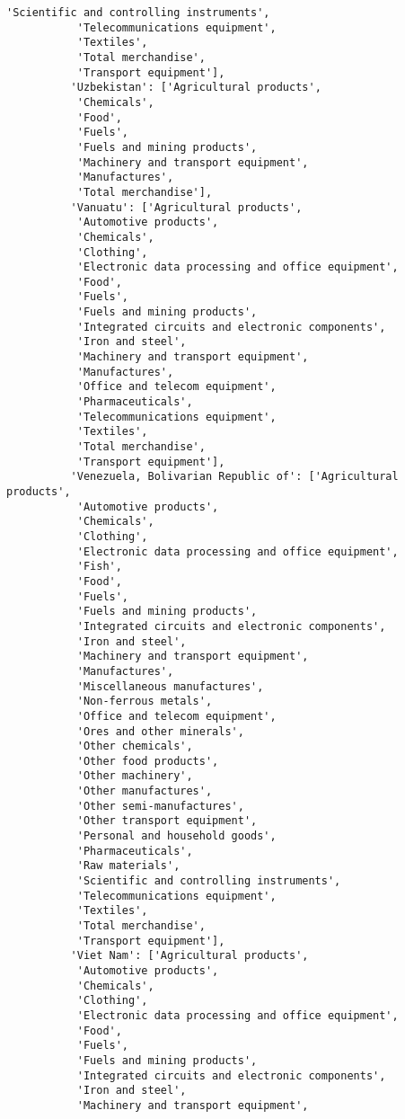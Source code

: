 \documentclass[11pt]{article}
\begin{document}
\begin{Verbatim}[commandchars=\\\{\}]
           'Scientific and controlling instruments',
           'Telecommunications equipment',
           'Textiles',
           'Total merchandise',
           'Transport equipment'],
          'Uzbekistan': ['Agricultural products',
           'Chemicals',
           'Food',
           'Fuels',
           'Fuels and mining products',
           'Machinery and transport equipment',
           'Manufactures',
           'Total merchandise'],
          'Vanuatu': ['Agricultural products',
           'Automotive products',
           'Chemicals',
           'Clothing',
           'Electronic data processing and office equipment',
           'Food',
           'Fuels',
           'Fuels and mining products',
           'Integrated circuits and electronic components',
           'Iron and steel',
           'Machinery and transport equipment',
           'Manufactures',
           'Office and telecom equipment',
           'Pharmaceuticals',
           'Telecommunications equipment',
           'Textiles',
           'Total merchandise',
           'Transport equipment'],
          'Venezuela, Bolivarian Republic of': ['Agricultural products',
           'Automotive products',
           'Chemicals',
           'Clothing',
           'Electronic data processing and office equipment',
           'Fish',
           'Food',
           'Fuels',
           'Fuels and mining products',
           'Integrated circuits and electronic components',
           'Iron and steel',
           'Machinery and transport equipment',
           'Manufactures',
           'Miscellaneous manufactures',
           'Non-ferrous metals',
           'Office and telecom equipment',
           'Ores and other minerals',
           'Other chemicals',
           'Other food products',
           'Other machinery',
           'Other manufactures',
           'Other semi-manufactures',
           'Other transport equipment',
           'Personal and household goods',
           'Pharmaceuticals',
           'Raw materials',
           'Scientific and controlling instruments',
           'Telecommunications equipment',
           'Textiles',
           'Total merchandise',
           'Transport equipment'],
          'Viet Nam': ['Agricultural products',
           'Automotive products',
           'Chemicals',
           'Clothing',
           'Electronic data processing and office equipment',
           'Food',
           'Fuels',
           'Fuels and mining products',
           'Integrated circuits and electronic components',
           'Iron and steel',
           'Machinery and transport equipment',

\end{Verbatim}
\end{document}
